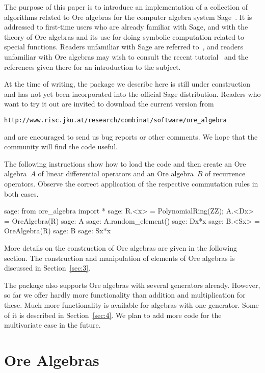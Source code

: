 \documentclass[11pt]{amsart}
\begin{document}
The purpose of this paper is to introduce an implementation of a collection of
algorithms related to Ore algebras for the computer algebra system
Sage~\cite{sage}. It is addressed to first-time users who are already familiar
with Sage, and with the theory of Ore algebras and its use for doing symbolic
computation related to special functions. Readers unfamiliar with Sage are referred
to~\cite{sage}, and readers unfamiliar with Ore algebras may wish to consult the
recent tutorial~\cite{kauers13} and the references given there for an introduction to
the subject.

At the time of writing, the package we describe here is still under construction
and has not yet been incorporated into the official Sage distribution. Readers
who want to try it out are invited to download the current version from 
\begin{center}
  \verb|http://www.risc.jku.at/research/combinat/software/ore_algebra|
\end{center}
and are encouraged to send us bug reports or other comments. We hope 
that the community will find the code useful.

The following instructions show how to load the code and then create an Ore
algebra~$A$ of linear differential operators and an Ore algebra~$B$ of
recurrence operators. Observe the correct application of the respective
commutation rules in both cases.

\begin{sageexample}
  sage: from ore_algebra import *
  sage: R.<x> = PolynomialRing(ZZ); A.<Dx> = OreAlgebra(R)
  sage: A
  sage: A.random_element()
  sage: Dx*x
  sage: B.<Sx> = OreAlgebra(R)
  sage: B
  sage: Sx*x
\end{sageexample}

More details on the construction of Ore algebras are given in the following
section. The construction and manipulation of elements of Ore algebras is
discussed in Section~\ref{sec:3}.

The package also supports Ore algebras with several generators already. However,
so far we offer hardly more functionality than addition and multiplication for
these. Much more functionality is available for algebras with one generator. 
Some of it is described in Section~\ref{sec:4}. We plan to add more code for the
multivariate case in the future.

\section{Ore Algebras}
\end{document}
